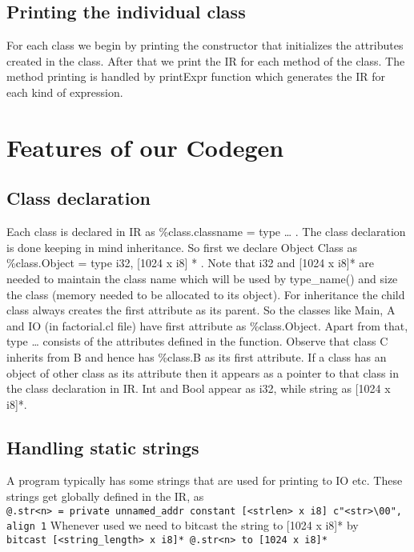 \documentclass{article}
\begin{document}
\subsection{Printing the individual class}

For each class  we begin by printing the constructor that initializes the attributes created in the class. After that we print the IR for each method of the class. The method printing is handled by printExpr function which generates the IR for each kind of expression.

\section{Features of our Codegen}

\subsection{Class declaration}
 
Each class is declared in IR as \%class.classname = type { … }. The class declaration is done keeping in mind inheritance. So first we declare Object Class as \%class.Object = type { i32, [1024 x i8] * }. Note that i32 and [1024 x i8]* are needed to maintain the class name which will be used by type\_name() and size the class (memory needed to be allocated to its object). For inheritance the child class always creates the first attribute as its parent. So the classes like Main, A and IO (in factorial.cl file) have first attribute as \%class.Object. Apart from that, type{ … } consists of the attributes defined in the function. Observe that class C inherits from B and hence has \%class.B as its first attribute. If a class has an object of other class as its attribute then it appears as a pointer to that class in the class declaration in IR. Int and Bool appear as i32, while string as [1024 x i8]*.

\subsection{Handling static strings}

A program typically has some strings that are used for printing to IO etc. These strings get globally defined in the IR, as \\
\verb|@.str<n> = private unnamed_addr constant [<strlen> x i8] c"<str>\00", align 1|
Whenever used we need to bitcast the string to [1024 x i8]* by \\
\verb|bitcast [<string_length> x i8]* @.str<n> to [1024 x i8]*|
\end{document}
